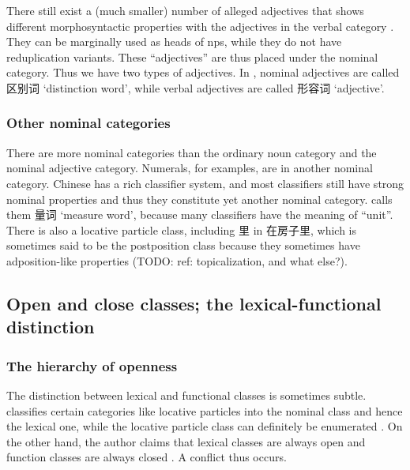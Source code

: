 \documentclass[UTF8, a4paper, oneside, scheme=plain]{ctexrep}
\newcommand*{\citesec}[1]{\S~{#1}}
\newcommand*{\citechap}[1]{chap.~{#1}}
\newcommand{\translate}[1]{`#1'}
\begin{document}
There still exist a (much smaller) number of alleged adjectives that shows 
different morphosyntactic properties with the adjectives in the verbal category 
\citep[\citechap{5}]{paul2014new}.
They can be marginally used as heads of \ac{np}s,
while they do not have reduplication variants.
These ``adjectives'' are thus placed under the nominal category.
Thus we have two types of adjectives.
In \citet{zhudexigrammar}, 
nominal adjectives are called 区别词 \translate{distinction word},
while verbal adjectives are called 形容词 \translate{adjective}.

\subsubsection{Other nominal categories}

There are more nominal categories than the ordinary noun category and the nominal adjective category.
Numerals, for examples, are in another nominal category.
Chinese has a rich classifier system,
and most classifiers still have strong nominal properties
and thus they constitute yet another nominal category.
\citet{zhudexigrammar} calls them 量词 \translate{measure word},
because many classifiers have the meaning of ``unit''.
There is also a locative particle class, including 里 in 在房子里,
which is sometimes said to be the postposition class
because they sometimes have adposition-like properties (TODO: ref: topicalization, and what else?).

\subsection{Open and close classes; the lexical-functional distinction}

\subsubsection{The hierarchy of openness}

The distinction between lexical and functional classes is sometimes subtle.
\citep[\citesec{3.6}]{zhudexigrammar} classifies 
certain categories like locative particles %
into the nominal class and hence the lexical one,
while the locative particle class can definitely be enumerated \citep[\citesec{4.4}]{zhudexigrammar}.
On the other hand, 
the author claims that lexical classes are always open 
and function classes are always closed \citet[\citesec{3.4}]{zhudexigrammar}.
A conflict thus occurs.
\end{document}

